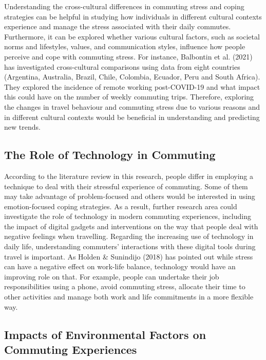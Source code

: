 \documentclass[
11pt, %
oneside, %
english, %
singlespacing, %
]{macthesis} %
\begin{document}
Understanding the cross-cultural differences in commuting stress and coping strategies can be helpful in studying how individuals in different cultural contexts experience and manage the stress associated with their daily commutes. Furthermore, it can be explored whether various cultural factors, such as societal norms and lifestyles, values, and communication styles, influence how people perceive and cope with commuting stress. For instance, Balbontin et al. (2021) has investigated cross-cultural comparisons using data from eight countries (Argentina, Australia, Brazil, Chile, Colombia, Ecuador, Peru and South Africa). They explored the incidence of remote working post-COVID-19 and what impact this could have on the number of weekly commuting trips. Therefore, exploring the changes in travel behaviour and commuting stress due to various reasons and in different cultural contexts would be beneficial in understanding and predicting new trends.

\hypertarget{the-role-of-technology-in-commuting}{%
\subsection{The Role of Technology in Commuting}\label{the-role-of-technology-in-commuting}}

According to the literature review in this research, people differ in employing a technique to deal with their stressful experience of commuting. Some of them may take advantage of problem-focused and others would be interested in using emotion-focused coping strategies. As a result, further research area could investigate the role of technology in modern commuting experiences, including the impact of digital gadgets and interventions on the way that people deal with negative feelings when travelling. Regarding the increasing use of technology in daily life, understanding commuters' interactions with these digital tools during travel is important. As Holden \& Sunindijo (2018) has pointed out while stress can have a negative effect on work-life balance, technology would have an improving role on that. For example, people can undertake their job responsibilities using a phone, avoid commuting stress, allocate their time to other activities and manage both work and life commitments in a more flexible way.

\hypertarget{impacts-of-environmental-factors-on-commuting-experiences}{%
\subsection{Impacts of Environmental Factors on Commuting Experiences}\label{impacts-of-environmental-factors-on-commuting-experiences}}
\end{document}
